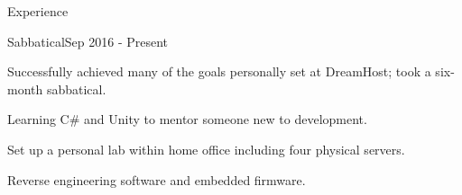 \documentclass{resume} %
\begin{document}

\begin{rSection}{Experience}


\begin{rSubsection}{Sabbatical}{Sep 2016 - Present}{}{}
\item Successfully achieved many of the goals personally set at DreamHost; took a six-month sabbatical.
\item Learning C\# and Unity to mentor someone new to development.
\item Set up a personal lab within home office including four physical servers.
\item Reverse engineering software and embedded firmware.
\end{rSubsection}



\end{rSection}
\end{document}
